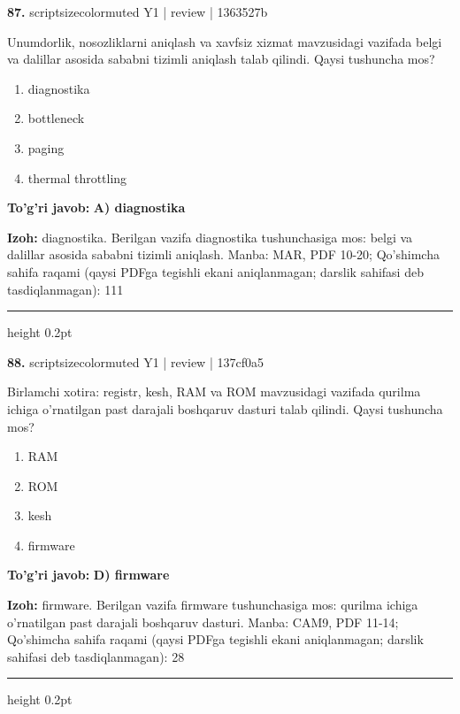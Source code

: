 \documentclass[10pt,a4paper]{article}
\begin{document}
{\bfseries\sffamily\color{ink} 87.} {scriptsizecolor{muted} Y1 | review | 1363527b}
\par
Unumdorlik, nosozliklarni aniqlash va xavfsiz xizmat mavzusidagi vazifada belgi va dalillar asosida sababni tizimli aniqlash talab qilindi. Qaysi tushuncha mos?
\begin{enumerate}[label=\Alph*),leftmargin=9mm]
\item diagnostika
\item bottleneck
\item paging
\item thermal throttling
\end{enumerate}
\begin{tcolorbox}[enhanced,breakable,colback=teal!4,colframe=teal!60!black,boxrule=0.45pt,arc=1.2mm,left=2.7mm,right=2.7mm,top=1.8mm,bottom=1.8mm,before skip=2mm,after skip=2mm]
{\bfseries\sffamily\color{teal}To'g'ri javob:} \textbf{A) diagnostika}
\par\smallskip
{\bfseries Izoh:} diagnostika. Berilgan vazifa diagnostika tushunchasiga mos: belgi va dalillar asosida sababni tizimli aniqlash. Manba: MAR, PDF 10-20; Qo'shimcha sahifa raqami (qaysi PDFga tegishli ekani aniqlanmagan; darslik sahifasi deb tasdiqlanmagan): 111
\end{tcolorbox}
\vspace{2mm}\hrule height 0.2pt\vspace{3mm}

{\bfseries\sffamily\color{ink} 88.} {scriptsizecolor{muted} Y1 | review | 137cf0a5}
\par
Birlamchi xotira: registr, kesh, RAM va ROM mavzusidagi vazifada qurilma ichiga o'rnatilgan past darajali boshqaruv dasturi talab qilindi. Qaysi tushuncha mos?
\begin{enumerate}[label=\Alph*),leftmargin=9mm]
\item RAM
\item ROM
\item kesh
\item firmware
\end{enumerate}
\begin{tcolorbox}[enhanced,breakable,colback=teal!4,colframe=teal!60!black,boxrule=0.45pt,arc=1.2mm,left=2.7mm,right=2.7mm,top=1.8mm,bottom=1.8mm,before skip=2mm,after skip=2mm]
{\bfseries\sffamily\color{teal}To'g'ri javob:} \textbf{D) firmware}
\par\smallskip
{\bfseries Izoh:} firmware. Berilgan vazifa firmware tushunchasiga mos: qurilma ichiga o'rnatilgan past darajali boshqaruv dasturi. Manba: CAM9, PDF 11-14; Qo'shimcha sahifa raqami (qaysi PDFga tegishli ekani aniqlanmagan; darslik sahifasi deb tasdiqlanmagan): 28
\end{tcolorbox}
\vspace{2mm}\hrule height 0.2pt\vspace{3mm}
\end{document}
